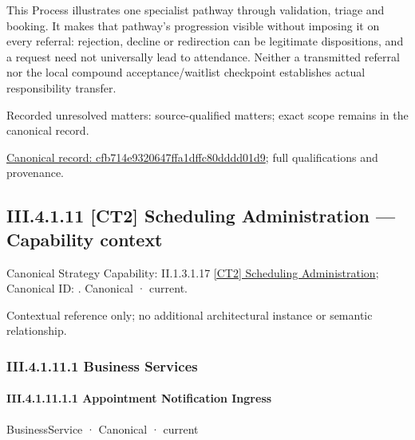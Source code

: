This Process illustrates one specialist pathway through validation, triage and booking. It makes that pathway's progression visible without imposing it on every referral: rejection, decline or redirection can be legitimate dispositions, and a request need not universally lead to attendance. Neither a transmitted referral nor the local compound acceptance/waitlist checkpoint establishes actual responsibility transfer.


{\small Recorded unresolved matters: source-qualified matters; exact scope remains in the canonical record.}\par
{\footnotesize \href{../../../../../../../continuum/business/business-process/cfb714e9320647ffa1dffc80dddd01d9.md}{Canonical record: cfb714e9320647ffa1dffc80dddd01d9}; full qualifications and provenance.}\par
\subsection*{III.4.1.11 [CT2] Scheduling Administration — Capability context}
\label{navigation:III.4.1.11}

{\small Canonical Strategy Capability: II.1.3.1.17 \hyperref[element:35fb3744c900470f9895056246a13fb1]{[CT2] Scheduling Administration}; Canonical ID: \texttt{}. Canonical · current.}\par
Contextual reference only; no additional architectural instance or semantic relationship.\par
\subsubsection*{III.4.1.11.1 Business Services}
\label{navigation:III.4.1.11.1}

\paragraph*{III.4.1.11.1.1 Appointment Notification Ingress}
\label{navigation:III.4.1.11.1.1}

\label{element:67045c71e2194f6ba19002edcea94ee0}
{\small BusinessService · Canonical · current}\par


